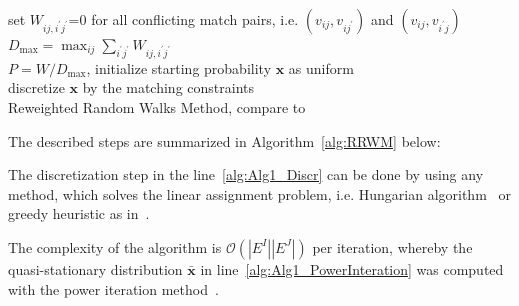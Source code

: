 \begin{algorithm}[h] 
	set $W_{ij,i^\prime j^\prime}$=0 for all conflicting match pairs, i.e. $(v_{ij},v_{ij^\prime})$ and $(v_{ij},v_{i^\prime j})$ \\
	$D_{\text{max}}=\max_{ij}\sum_{i^\prime j^\prime}W_{ij,i^\prime j^\prime}$ \\
	$P=W/D_{\text{max}}$, initialize starting probability $\mathbf{x}$ as uniform\\
	discretize $\mathbf{x}$ by the matching constraints \label{alg:Alg1_Discr} \\
	\caption{Reweighted Random Walks Method, compare to~\cite{Cho2010_RRWM}}    
	\label{alg:RRWM}
\end{algorithm}

The described steps are summarized in Algorithm~\ref{alg:RRWM} below:

The discretization step in the line~\ref{alg:Alg1_Discr} can be done by using any method, which solves the linear assignment problem, i.e. Hungarian algorithm~\cite{Kuhn1955} or greedy heuristic as in~\cite{Leordeanu2005_SM}.

The complexity of the algorithm is $\mathcal{O}(|E^I||E^J|)$ per iteration, whereby the quasi-stationary distribution $\mathbf{\bar{x}}$ in line~\ref{alg:Alg1_PowerInteration} was computed with the power iteration method~\cite{PowerIteration}.


